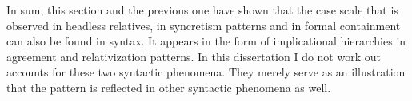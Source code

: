 In sum, this section and the previous one have shown that the case scale that is observed in headless relatives, in syncretism patterns and in formal containment can also be found in syntax. It appears in the form of implicational hierarchies in agreement and relativization patterns. In this dissertation I do not work out accounts for these two syntactic phenomena. They merely serve as an illustration that the pattern is reflected in other syntactic phenomena as well.
